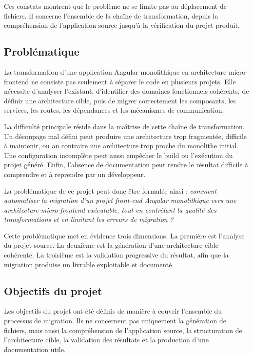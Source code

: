 Ces constats montrent que le problème ne se limite pas au déplacement de fichiers. Il concerne l'ensemble de la chaîne de transformation, depuis la compréhension de l'application source jusqu'à la vérification du projet produit.

\subsection{Problématique}

La transformation d'une application Angular monolithique en architecture micro-frontend ne consiste pas seulement à séparer le code en plusieurs projets. Elle nécessite d'analyser l'existant, d'identifier des domaines fonctionnels cohérents, de définir une architecture cible, puis de migrer correctement les composants, les services, les routes, les dépendances et les mécanismes de communication.

La difficulté principale réside dans la maîtrise de cette chaîne de transformation. Un découpage mal défini peut produire une architecture trop fragmentée, difficile à maintenir, ou au contraire une architecture trop proche du monolithe initial. Une configuration incomplète peut aussi empêcher le build ou l'exécution du projet généré. Enfin, l'absence de documentation peut rendre le résultat difficile à comprendre et à reprendre par un développeur.

La problématique de ce projet peut donc être formulée ainsi : \textit{comment automatiser la migration d'un projet front-end Angular monolithique vers une architecture micro-frontend exécutable, tout en contrôlant la qualité des transformations et en limitant les erreurs de migration ?}

Cette problématique met en évidence trois dimensions. La première est l'analyse du projet source. La deuxième est la génération d'une architecture cible cohérente. La troisième est la validation progressive du résultat, afin que la migration produise un livrable exploitable et documenté.

\subsection{Objectifs du projet}

Les objectifs du projet ont été définis de manière à couvrir l'ensemble du processus de migration. Ils ne concernent pas uniquement la génération de fichiers, mais aussi la compréhension de l'application source, la structuration de l'architecture cible, la validation des résultats et la production d'une documentation utile.

